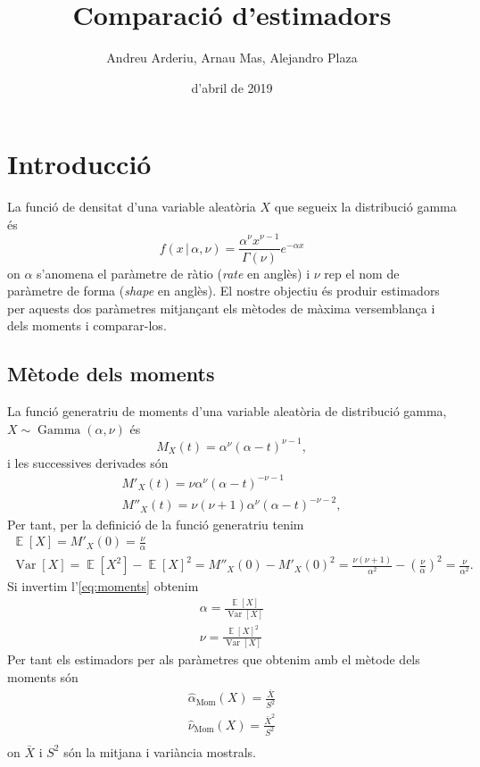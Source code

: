 \documentclass[12pt, catalan]{article}
\title{\sffamily {\bfseries Entrega 2:} Comparació d'estimadors}
\author{\sffamily Andreu Arderiu, Arnau Mas, Alejandro Plaza}
\date{\sffamily 25 d'abril de 2019}
\numberwithin{table}{section}
\numberwithin{figure}{section}
\numberwithin{equation}{section}
\newcommand{\cond}{\, \vert \,}
\DeclareMathOperator{\DGamma}{Gamma}
\DeclareMathOperator{\E}{\mathbb{E}}
\DeclareMathOperator{\Var}{Var}
\begin{document}
\maketitle

\section{Introducció}
La funció de densitat d'una variable aleatòria \( X \) que segueix la distribució gamma és
\begin{equation*}
	f(x \cond \alpha, \nu) = \frac{\alpha^\nu x^{\nu - 1}}{\Gamma(\nu)} e^{-\alpha x}
\end{equation*}
on \( \alpha \) s'anomena el paràmetre de ràtio (\emph{rate} en anglès) i \( \nu \) rep el nom de paràmetre de forma (\emph{shape} en anglès). El nostre objectiu és produir estimadors per aquests dos paràmetres mitjançant els mètodes de màxima versemblança i dels moments i comparar-los.  

\subsection{Mètode dels moments}
La funció generatriu de moments d'una variable aleatòria de distribució gamma, \( X \sim \DGamma(\alpha, \nu) \) és
\begin{equation*}
	M_X(t) = \alpha^\nu (\alpha - t)^{\nu - 1},
\end{equation*}
i les successives derivades són
\begin{gather*}
	M'_X(t) = \nu \alpha^\nu (\alpha - t)^{-\nu - 1} \\
	M''_X(t) = \nu(\nu + 1) \alpha^\nu (\alpha - t)^{-\nu - 2}, 
\end{gather*}
Per tant, per la definició de la funció generatriu tenim
\begin{equation} \label{eq:moments}
	\begin{gathered}
		\E[X] = M'_X(0) = \frac{\nu}{\alpha} \\
		\Var[X] = \E[X^2] - \E[X]^2 = M''_X(0) - M'_X(0)^2 = \frac{\nu(\nu + 1)}{\alpha^2} - \left( \frac{\nu}{\alpha} \right)^2 = \frac{\nu}{\alpha^2}. 
	\end{gathered}
\end{equation}
Si invertim l'\cref{eq:moments} obtenim
\begin{equation} \label{eq:moments invertit}
	\begin{gathered}
		\alpha = \frac{\E[X]}{\Var[X]} \\
		\nu = \frac{\E[X]^2}{\Var[X]}
	\end{gathered}
\end{equation}
Per tant els estimadors per als paràmetres que obtenim amb el mètode dels moments són
\begin{equation} \label{eq:estimadors moments}
\begin{gathered}
	\hat{\alpha}_\text{Mom}(X) = \frac{\bar{X}}{S^2} \\
	\hat{\nu}_\text{Mom}(X) = \frac{\bar{X}^2}{S^2} \\
\end{gathered}
\end{equation}
on \( \bar{X} \) i \( S^2 \) són la mitjana i variància mostrals.   
\end{document}
